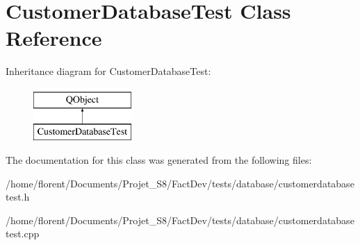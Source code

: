 \hypertarget{classCustomerDatabaseTest}{\section{Customer\-Database\-Test Class Reference}
\label{classCustomerDatabaseTest}
}
Inheritance diagram for Customer\-Database\-Test\-:\begin{figure}[H]
\begin{center}
\leavevmode
\includegraphics[height=2.000000cm]{d2/d63/classCustomerDatabaseTest}
\end{center}
\end{figure}


The documentation for this class was generated from the following files\-:\begin{DoxyCompactItemize}
\item 
/home/florent/\-Documents/\-Projet\-\_\-\-S8/\-Fact\-Dev/tests/database/customerdatabasetest.\-h\item 
/home/florent/\-Documents/\-Projet\-\_\-\-S8/\-Fact\-Dev/tests/database/customerdatabasetest.\-cpp\end{DoxyCompactItemize}
